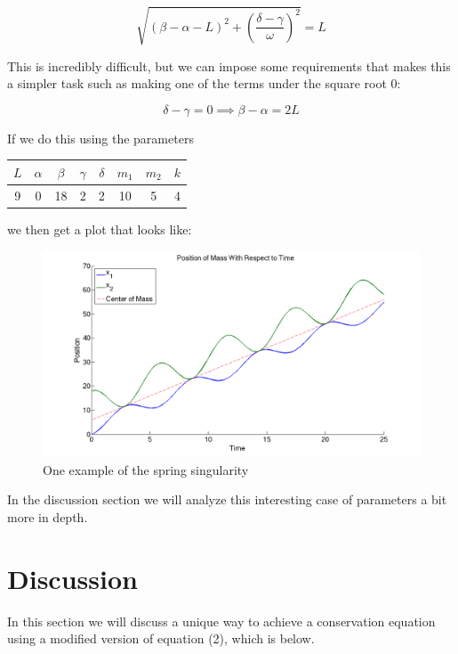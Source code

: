 \documentclass[11pt, oneside]{article}   	%
\begin{document}
$$\sqrt{(\beta - \alpha -L)^2 + \left(\frac{\delta - \gamma}{\omega}\right)^2}=L$$

This is incredibly difficult, but we can impose some requirements that makes this a simpler task such as making one of the terms under the square root $0$:

$$\delta - \gamma = 0 \implies \beta - \alpha = 2L$$

If we do this using the parameters

\begin{center}

\begin{tabular}{| c | c | c | c | c | c | c | c |}

\hline

$L$ & $\alpha$ & $\beta$ & $\gamma$ & $\delta$ & $m_1$ & $m_2$ & $k$ \\

\hline

 9 & 0 & 18 & 2 & 2 & 10 & 5 & 4\\

\hline

\end{tabular}

\end{center}

we then get a plot that looks like: \\

\begin{figure}[h!]
\centering \includegraphics[scale=0.3]{spring_sing}
\caption{\label{singularity}One example of the spring singularity}
\end{figure}

In the discussion section we will analyze this interesting case of parameters a bit more in depth.

\section{Discussion}
In this section we will discuss a unique way to achieve a conservation equation using a modified version of equation (2), which is below.
\end{document}

